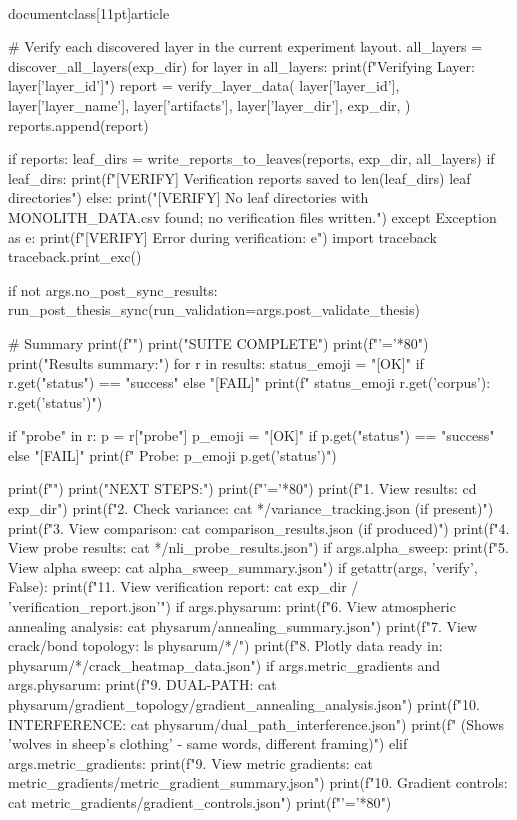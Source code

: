 \\documentclass[11pt]{article}
\begin{document}
\begin{CodeBlock}
            # Verify each discovered layer in the current experiment layout.
            all_layers = discover_all_layers(exp_dir)
            for layer in all_layers:
                print(f"Verifying Layer: {layer['layer_id']}")
                report = verify_layer_data(
                    layer['layer_id'],
                    layer['layer_name'],
                    layer['artifacts'],
                    layer['layer_dir'],
                    exp_dir,
                )
                reports.append(report)
            
            if reports:
                leaf_dirs = write_reports_to_leaves(reports, exp_dir, all_layers)
                if leaf_dirs:
                    print(f"[VERIFY] Verification reports saved to {len(leaf_dirs)} leaf directories")
                else:
                    print("[VERIFY] No leaf directories with MONOLITH_DATA.csv found; no verification files written.")
        except Exception as e:
            print(f"[VERIFY] Error during verification: {e}")
            import traceback
            traceback.print_exc()

    if not args.no_post_sync_results:
        run_post_thesis_sync(run_validation=args.post_validate_thesis)

    # Summary
    print(f"")
    print("SUITE COMPLETE")
    print(f"{'='*80}")
    print("Results summary:")
    for r in results:
        status_emoji = "[OK]" if r.get("status") == "success" else "[FAIL]"
        print(f"  {status_emoji} {r.get('corpus')}: {r.get('status')}")

        if "probe" in r:
            p = r["probe"]
            p_emoji = "[OK]" if p.get("status") == "success" else "[FAIL]"
            print(f"      Probe: {p_emoji} {p.get('status')}")

    print(f"")
    print("NEXT STEPS:")
    print(f"{'='*80}")
    print(f"1. View results: cd {exp_dir}")
    print(f"2. Check variance: cat */variance_tracking.json (if present)")
    print(f"3. View comparison: cat comparison_results.json (if produced)")
    print(f"4. View probe results: cat */nli_probe_results.json")
    if args.alpha_sweep:
        print(f"5. View alpha sweep: cat alpha_sweep_summary.json")
    if getattr(args, 'verify', False):
        print(f"11. View verification report: cat {exp_dir / 'verification_report.json'}")
    if args.physarum:
        print(f"6. View atmospheric annealing analysis: cat physarum/annealing_summary.json")
        print(f"7. View crack/bond topology: ls physarum/*/")
        print(f"8. Plotly data ready in: physarum/*/crack_heatmap_data.json")
    if args.metric_gradients and args.physarum:
        print(f"9. DUAL-PATH: cat physarum/gradient_topology/gradient_annealing_analysis.json")
        print(f"10. INTERFERENCE: cat physarum/dual_path_interference.json")
        print(f"    (Shows 'wolves in sheep's clothing' - same words, different framing)")
    elif args.metric_gradients:
        print(f"9. View metric gradients: cat metric_gradients/metric_gradient_summary.json")
        print(f"10. Gradient controls: cat metric_gradients/gradient_controls.json")
    print(f"{'='*80}")



\end{CodeBlock}
\end{document}
